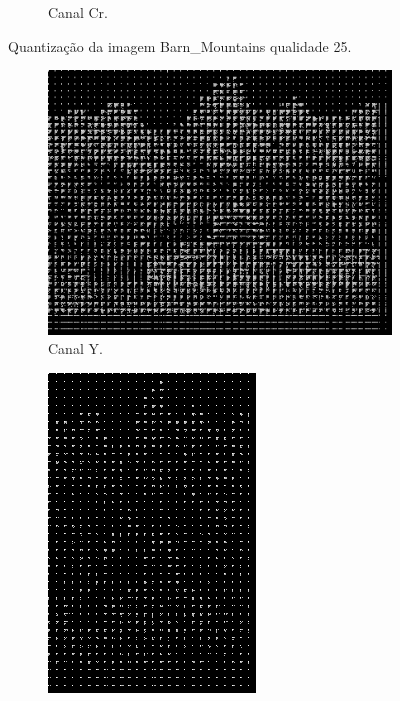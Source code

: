 \documentclass[a4paper, 12pt]{article}
\begin{document}
\begin{figure}[H]
\begin{subfigure}{0.3\textwidth}
                \caption{ Canal Cr.}
            \end{subfigure}
            \caption{\label{fig:my_label} Quantização da imagem Barn\_Mountains qualidade 25.}
        \end{figure}
        
        \vspace{0.5cm}
    
        \begin{figure}[H]
            \begin{subfigure}{0.3\textwidth}
                \centering
                \includegraphics[scale=0.5]{resources/Quantization/YQuantization50.png}
                \caption{ Canal Y.}
            \end{subfigure}
            \hfill
            \begin{subfigure}{0.3\textwidth}
                \centering 
                \includegraphics[scale=0.5]{resources/Quantization/CBQuantization50.png}

\end{subfigure}
\end{figure}
\end{document}
